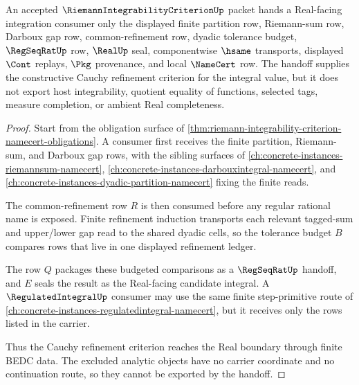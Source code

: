 \begin{theorem}
\label{thm:riemann-integrability-criterion-cauchy-refinement-handoff}
An accepted $\RiemannIntegrabilityCriterionUp$ packet hands a Real-facing integration consumer only the displayed finite partition row, Riemann-sum row, Darboux gap row, common-refinement row, dyadic tolerance budget, $\RegSeqRatUp$ row, $\RealUp$ seal, componentwise $\hsame$ transports, displayed $\Cont$ replays, $\Pkg$ provenance, and local $\NameCert$ row. The handoff supplies the constructive Cauchy refinement criterion for the integral value, but it does not export host integrability, quotient equality of functions, selected tags, measure completion, or ambient Real completeness.
\end{theorem}
\begin{proof}
Start from the obligation surface of \autoref{thm:riemann-integrability-criterion-namecert-obligations}. A consumer first receives the finite partition, Riemann-sum, and Darboux gap rows, with the sibling surfaces of \autoref{ch:concrete-instances-riemannsum-namecert}, \autoref{ch:concrete-instances-darbouxintegral-namecert}, and \autoref{ch:concrete-instances-dyadic-partition-namecert} fixing the finite reads.

The common-refinement row $R$ is then consumed before any regular rational name is exposed. Finite refinement induction transports each relevant tagged-sum and upper/lower gap read to the shared dyadic cells, so the tolerance budget $B$ compares rows that live in one displayed refinement ledger.

The row $Q$ packages these budgeted comparisons as a $\RegSeqRatUp$ handoff, and $E$ seals the result as the Real-facing candidate integral. A $\RegulatedIntegralUp$ consumer may use the same finite step-primitive route of \autoref{ch:concrete-instances-regulatedintegral-namecert}, but it receives only the rows listed in the carrier.

Thus the Cauchy refinement criterion reaches the Real boundary through finite BEDC data. The excluded analytic objects have no carrier coordinate and no continuation route, so they cannot be exported by the handoff.
\end{proof}


